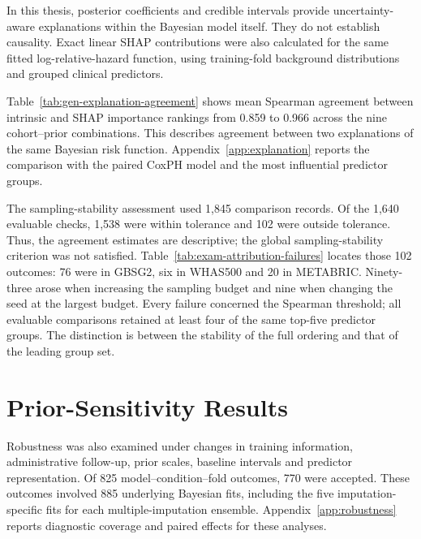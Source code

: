 In this thesis, posterior coefficients and credible intervals provide uncertainty-aware explanations within the Bayesian model itself. They do not establish causality. Exact linear SHAP contributions were also calculated for the same fitted log-relative-hazard function, using training-fold background distributions and grouped clinical predictors.



Table~\ref{tab:gen-explanation-agreement} shows mean Spearman agreement between intrinsic and SHAP importance rankings from 0.859 to 0.966 across the nine cohort--prior combinations. This describes agreement between two explanations of the same Bayesian risk function. Appendix~\ref{app:explanation} reports the comparison with the paired CoxPH model and the most influential predictor groups.

The sampling-stability assessment used 1,845 comparison records. Of the 1,640 evaluable checks, 1,538 were within tolerance and 102 were outside tolerance. Thus, the agreement estimates are descriptive; the global sampling-stability criterion was not satisfied. Table~\ref{tab:exam-attribution-failures} locates those 102 outcomes: 76 were in GBSG2, six in WHAS500 and 20 in METABRIC. Ninety-three arose when increasing the sampling budget and nine when changing the seed at the largest budget. Every failure concerned the Spearman threshold; all evaluable comparisons retained at least four of the same top-five predictor groups. The distinction is between the stability of the full ordering and that of the leading group set.



\section{Prior-Sensitivity Results}\label{prior-sensitivity-results-1}

Robustness was also examined under changes in training information, administrative follow-up, prior scales, baseline intervals and predictor representation. Of 825 model--condition--fold outcomes, 770 were accepted. These outcomes involved 885 underlying Bayesian fits, including the five imputation-specific fits for each multiple-imputation ensemble. Appendix~\ref{app:robustness} reports diagnostic coverage and paired effects for these analyses.


